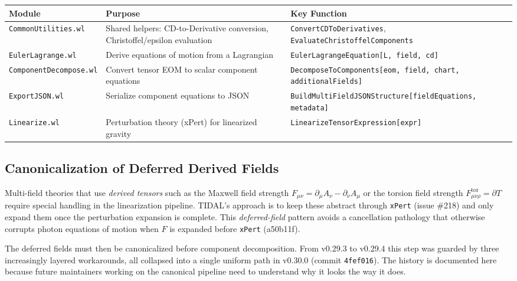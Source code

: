 \begin{table}[htbp]
\centering
\begin{tabular}{@{}lp{4cm}p{5.5cm}@{}}
\toprule
Module & Purpose & Key Function \\
\midrule
\texttt{CommonUtilities.wl}    & Shared helpers: CD-to-Derivative conversion, Christoffel/epsilon evaluation & \texttt{ConvertCDToDerivatives}, \texttt{EvaluateChristoffelComponents} \\
\texttt{EulerLagrange.wl}      & Derive equations of motion from a Lagrangian & \texttt{EulerLagrangeEquation[L, field, cd]} \\
\texttt{ComponentDecompose.wl}  & Convert tensor EOM to scalar component equations & \texttt{DecomposeToComponents[eom, field, chart, additionalFields]} \\
\texttt{ExportJSON.wl}          & Serialize component equations to JSON & \texttt{BuildMultiFieldJSONStructure[fieldEquations, metadata]} \\
\texttt{Linearize.wl}           & Perturbation theory (xPert) for linearized gravity & \texttt{LinearizeTensorExpression[expr]} \\
\bottomrule
\end{tabular}
\end{table}

\subsection{Canonicalization of Deferred Derived Fields}
\label{subsec:canonicalization}

Multi-field theories that use \emph{derived tensors} such as the Maxwell
field strength $F_{\mu\nu} = \partial_\mu A_\nu - \partial_\nu A_\mu$ or
the torsion field strength $F^{\text{tor}}_{\mu\nu\rho} = \partial T$
require special handling in the linearization pipeline. TIDAL's approach
is to keep these abstract through \texttt{xPert} (issue \#218) and only
expand them once the perturbation expansion is complete. This
\emph{deferred-field} pattern avoids a cancellation pathology that
otherwise corrupts photon equations of motion when $F$ is expanded before
\texttt{xPert} (a50b11f).

The deferred fields must then be canonicalized before component
decomposition. From v0.29.3 to v0.29.4 this step was guarded by three
increasingly layered workarounds, all collapsed into a single uniform
path in v0.30.0 (commit \texttt{4fef016}). The history is documented
here because future maintainers working on the canonical pipeline need
to understand why it looks the way it does.

